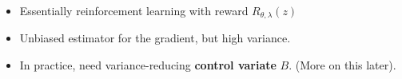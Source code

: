 \begin{frame}
\begin{itemize}
    \item Essentially reinforcement learning with reward $R_{\theta, \lambda}(z)$
    \item Unbiased estimator for the gradient, but high variance.
    \item In practice, need variance-reducing \textbf{control variate} $B$. (More on this later).
\end{itemize}    
\end{frame}

